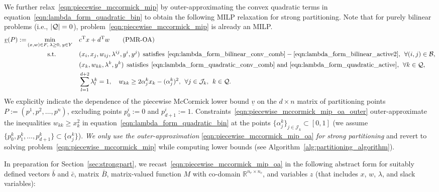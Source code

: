 \documentclass{article}
\newcommand{\pmc}{piecewise McCormick}
\newcommand{\pp}{partitioning points}
\DeclarePairedDelimiter\abs{\lvert}{\rvert}%
\newcommand{\Q}{\mathcal{Q}}
\begin{document}
We further relax~\eqref{eqn:piecewise_mccormick_mip} by outer-approximating the convex quadratic terms in equation~\eqref{eqn:lambda_form_quadratic_bin} to obtain the following MILP relaxation for strong partitioning.
Note that for purely bilinear problems (i.e., $\abs{\Q} = 0$), problem~\eqref{eqn:piecewise_mccormick_mip} is already an MILP.
{
\begin{alignat}{2}
\label{eqn:piecewise_mccormick_mip_oa}
\underline{v}(P) := &\min_{(x,w) \in F, \:\lambda \geq 0, \: y \in Y} && c^{\textup{T}} x + d^{\textup{T}} w \tag{PMR-OA} \\
&\qquad\quad\: \text{s.t.} && (x_i, x_j, w_{ij}, \lambda^{ij}, y^i, y^j) \:\: \text{satisfies} \:\: \eqref{eqn:lambda_form_bilinear_conv_comb}-\eqref{eqn:lambda_form_bilinear_active2}, \:\: \forall (i,j) \in \mathcal{B}, \nonumber\\
& && (x_k, w_{kk}, \lambda^k, y^k) \:\: \text{satisfies} \:\: \eqref{eqn:lambda_form_quadratic_conv_comb} \text{ and } \eqref{eqn:lambda_form_quadratic_active}, \:\: \forall k \in \mathcal{Q}, \nonumber \\
& && \sum_{l=1}^{d+2} \lambda^{k}_l = 1, \quad w_{kk} \geq 2 \alpha^k_j x_k - (\alpha^k_j)^2, \:\: \forall j \in \mathcal{J}_k, \:\: k \in \mathcal{Q}. \label{eqn:piecewise_mccormick_mip_oa_outer}
\end{alignat}%
}%
We explicitly indicate the dependence of the {\pmc} lower bound $\underline{v}$ on the $d \times n$ matrix of {\pp} $P := (p^1,p^2,\dots,p^n)$, excluding points $p^i_0 := 0$ and $p^i_{d+1} := 1$.
Constraints~\eqref{eqn:piecewise_mccormick_mip_oa_outer} outer-approximate the inequalities $w_{kk} \geq x^2_k$ in equation~\eqref{eqn:lambda_form_quadratic_bin} at the points $\{\alpha^k_j\}_{j \in \mathcal{J}_k} \subset [0,1]$ (we assume $\{p^k_0,p^k_1,\dots,p^k_{d+1}\} \subset \{\alpha^k_j\}$).
\textit{We only use the outer-approximation} \eqref{eqn:piecewise_mccormick_mip_oa} \textit{for strong partitioning} and revert to solving problem~\eqref{eqn:piecewise_mccormick_mip} while computing lower bounds (see Algorithm~\ref{alg:partitioning_algorithm}).




In preparation for Section~\ref{sec:strongpart}, we recast~\eqref{eqn:piecewise_mccormick_mip_oa} in the following abstract form for suitably defined vectors $\bar{b}$ and $\bar{c}$, matrix $\bar{B}$, matrix-valued function $M$ with co-domain $\mathbb{R}^{n_r \times n_c}$,
and variables $z$ (that includes $x$, $w$, $\lambda$, and slack variables):
\end{document}
